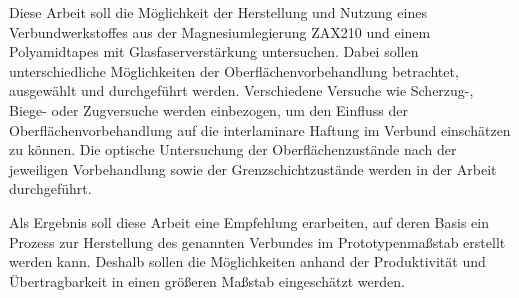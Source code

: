 Diese Arbeit soll die Möglichkeit der Herstellung und Nutzung eines Verbundwerkstoffes aus der Magnesiumlegierung ZAX210 und einem Polyamidtapes mit Glasfaserverstärkung untersuchen.
Dabei sollen unterschiedliche Möglichkeiten der Oberflächenvorbehandlung betrachtet, ausgewählt und durchgeführt werden.
Verschiedene Versuche wie Scherzug-, Biege- oder Zugversuche werden einbezogen, um den Einfluss der Oberflächenvorbehandlung auf die interlaminare Haftung im Verbund einschätzen zu können.
Die optische Untersuchung der Oberflächenzustände nach der jeweiligen Vorbehandlung sowie der Grenzschichtzustände werden in der Arbeit durchgeführt.

Als Ergebnis soll diese Arbeit eine Empfehlung erarbeiten, auf deren Basis ein Prozess zur Herstellung des genannten Verbundes im Prototypenmaßstab erstellt werden kann.
Deshalb sollen die Möglichkeiten anhand der Produktivität und Übertragbarkeit in einen größeren Maßstab eingeschätzt werden.



%
